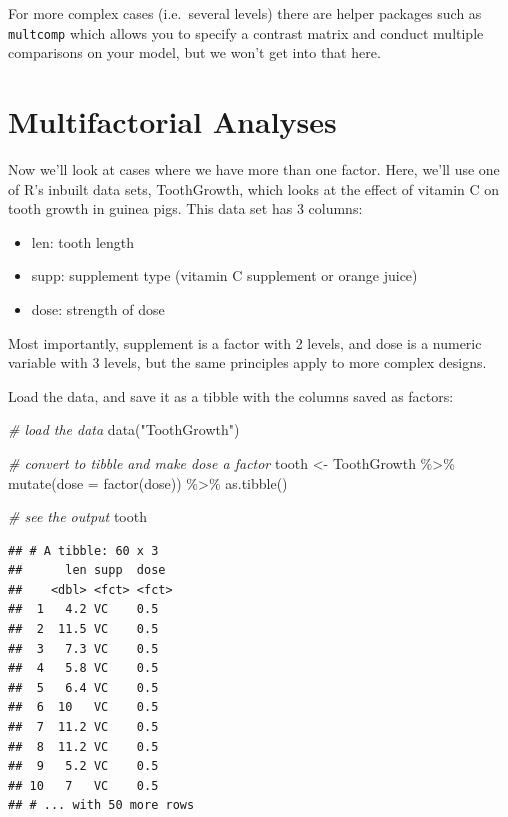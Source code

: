 \documentclass[
]{book}
\newenvironment{Shaded}{\begin{snugshade}}{\end{snugshade}}
\newcommand{\AttributeTok}[1]{\textcolor[rgb]{0.77,0.63,0.00}{#1}}
\newcommand{\CommentTok}[1]{\textcolor[rgb]{0.56,0.35,0.01}{\textit{#1}}}
\newcommand{\FunctionTok}[1]{\textcolor[rgb]{0.00,0.00,0.00}{#1}}
\newcommand{\NormalTok}[1]{#1}
\newcommand{\OtherTok}[1]{\textcolor[rgb]{0.56,0.35,0.01}{#1}}
\newcommand{\SpecialCharTok}[1]{\textcolor[rgb]{0.00,0.00,0.00}{#1}}
\newcommand{\StringTok}[1]{\textcolor[rgb]{0.31,0.60,0.02}{#1}}
\providecommand{\tightlist}{%
  \setlength{\itemsep}{0pt}\setlength{\parskip}{0pt}}
\begin{document}
For more complex cases (i.e.~several levels) there are helper packages such as \texttt{multcomp} which allows you to specify a contrast matrix and conduct multiple comparisons on your model, but we won't get into that here.

\hypertarget{multifactorial-analyses}{%
\section{Multifactorial Analyses}\label{multifactorial-analyses}}

Now we'll look at cases where we have more than one factor. Here, we'll use one of R's inbuilt data sets, ToothGrowth, which looks at the effect of vitamin C on tooth growth in guinea pigs. This data set has 3 columns:

\begin{itemize}
\tightlist
\item
  len: tooth length
\item
  supp: supplement type (vitamin C supplement or orange juice)
\item
  dose: strength of dose
\end{itemize}

Most importantly, supplement is a factor with 2 levels, and dose is a numeric variable with 3 levels, but the same principles apply to more complex designs.

Load the data, and save it as a tibble with the columns saved as factors:

\begin{Shaded}
\begin{Highlighting}[]
\CommentTok{\# load the data}
\FunctionTok{data}\NormalTok{(}\StringTok{"ToothGrowth"}\NormalTok{)}

\CommentTok{\# convert to tibble and make dose a factor}
\NormalTok{tooth }\OtherTok{\textless{}{-}}\NormalTok{ ToothGrowth }\SpecialCharTok{\%\textgreater{}\%}
  \FunctionTok{mutate}\NormalTok{(}\AttributeTok{dose =} \FunctionTok{factor}\NormalTok{(dose)) }\SpecialCharTok{\%\textgreater{}\%}
  \FunctionTok{as.tibble}\NormalTok{()}

\CommentTok{\# see the output}
\NormalTok{tooth}
\end{Highlighting}
\end{Shaded}

\begin{verbatim}
## # A tibble: 60 x 3
##      len supp  dose 
##    <dbl> <fct> <fct>
##  1   4.2 VC    0.5  
##  2  11.5 VC    0.5  
##  3   7.3 VC    0.5  
##  4   5.8 VC    0.5  
##  5   6.4 VC    0.5  
##  6  10   VC    0.5  
##  7  11.2 VC    0.5  
##  8  11.2 VC    0.5  
##  9   5.2 VC    0.5  
## 10   7   VC    0.5  
## # ... with 50 more rows
\end{verbatim}
\end{document}
